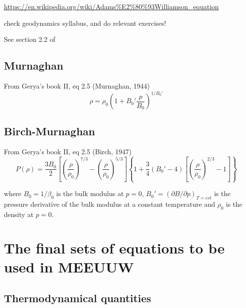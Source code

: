 \documentclass[a4paper,11pt]{article}
\begin{document}
\url{https://en.wikipedia.org/wiki/Adams%E2%80%93Williamson_equation}

check geodynamics syllabus, and do relevant exercises!

\cite{wiad23}

See section 2.2 of \cite{zhyu96b}


\subsection{Murnaghan}

From Gerya's book II, eq 2.5 (Murnaghan, 1944)
\[
\rho=\rho_0 \left(1 + B_0' \frac{p}{B_0} \right)^{1/B_0'}
\]

\subsection{Birch-Murnaghan}

From Gerya's book II, eq 2.5 (Birch, 1947)
\[
P(\rho) = \frac{3B_0}{2}
\left[
\left( \frac{\rho}{\rho_0}  \right)^{7/3} - \left( \frac{\rho}{\rho_0}  \right)^{5/3}
\right]
\left\{
1 + \frac34 \left( B_0'-4 \right) \left[ \left(\frac{\rho}{\rho_0}  \right)^{2/3} -1 \right] 
\right\}
\]

where $B_0 = 1/\beta_0$ is the bulk modulus at $p=0$,
$B_0' = (\partial B/\partial p)_{T=cst}$ is the pressure derivative of the bulk modulus at a constant temperature and $\rho_0$ is the density at $p=0$.

\newpage
\section{The final sets of equations to be used in MEEUUW}

\subsection{Thermodynamical quantities}
\end{document}
